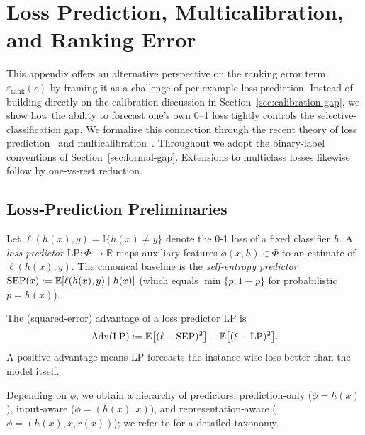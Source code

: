 \section{Loss Prediction, Multicalibration, and Ranking Error}
\label{app:loss-pred}

This appendix offers an alternative perspective on the ranking error term \(\varepsilon_{\text{rank}}(c)\) by framing it as a challenge of per-example loss prediction. Instead of building directly on the calibration discussion in Section~\ref{sec:calibration-gap}, we show how the ability to forecast one’s own 0--1 loss tightly controls the selective-classification gap. We formalize this connection through the recent theory of loss prediction~\citep{gollakota2025loss} and multicalibration~\citep{hebert2018multicalibration}. Throughout we adopt the binary-label conventions of Section~\ref{sec:formal-gap}. Extensions to multiclass losses likewise follow by one-vs-rest reduction.

\subsection{Loss‑Prediction Preliminaries}
\label{sec:loss_pred_prel}

Let \(\ell(h(x),y)=\mathbb{I}\{h(x)\neq y\}\) denote the 0-1 loss of a
fixed classifier \(h\).  A \emph{loss predictor}
\(\mathrm{LP}\colon\Phi\to\mathbb{R}\) maps auxiliary features
\(\phi(x,h)\in\Phi\) to an estimate of \(\ell(h(x),y)\).
The canonical baseline is the \emph{self‑entropy predictor}
\(\mathrm{SEP}(x):=\mathbb{E}[\ell(h(x),y)\mid h(x)]\) 
(which equals \(\min\{p,1-p\}\) for probabilistic \(p=h(x)\)).

\begin{definition}
\label{def:advantage}
The (squared‑error) advantage of a loss predictor \(\mathrm{LP}\) is
\begin{equation}
\mathrm{Adv}(\mathrm{LP})
:=\mathbb{E}\bigl[(\ell-\mathrm{SEP})^{2}\bigr]
  -\mathbb{E}\bigl[(\ell-\mathrm{LP})^{2}\bigr].
\end{equation}
A positive advantage means \(\mathrm{LP}\) forecasts the
instance‑wise loss better than the model itself.
\end{definition}

Depending on \(\phi\), we obtain a hierarchy of predictors:
prediction‑only (\(\phi=h(x)\)), input‑aware (\(\phi=(h(x),x)\)),
and representation‑aware (\(\phi=(h(x),x,r(x))\)); we refer to
\citet{gollakota2025loss} for a detailed taxonomy.


